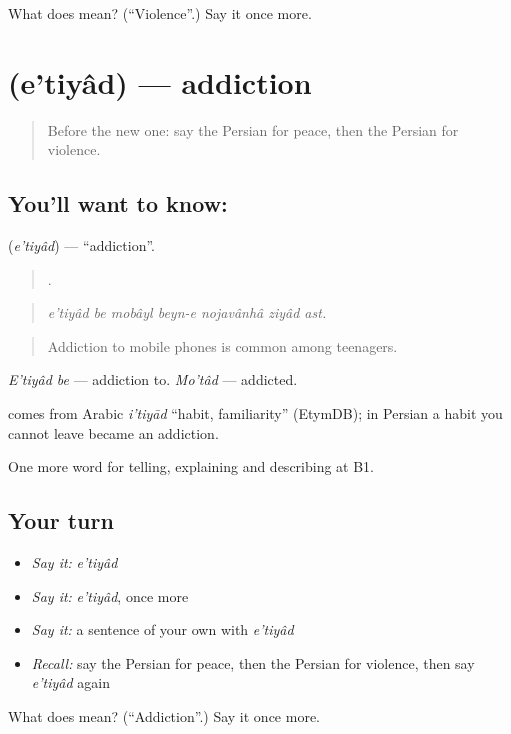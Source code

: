 \begin{tcolorbox}[breakable,colback=teal!4,colframe=teal!35!black,title={Before you move on}]
What does  mean? (\textquotedblleft{}Violence\textquotedblright{}.) Say it once more.
\end{tcolorbox}
\section[\texorpdfstring{\fa{اعتیاد} (e'tiyâd)}{اعتیاد (e'tiyâd)}]{ (e'tiyâd) — addiction}

\label{lesson:FA-C389-etiyad}



\begin{quote}
Before the new one: say the Persian for peace, then the Persian for violence.
\end{quote}

\subsection*{You'll want to know: }
\textbf{} (\emph{e'tiyâd}) — \textquotedblleft{}addiction\textquotedblright{}.

\begin{quote}
      .
\end{quote}

\begin{quote}
\emph{e'tiyâd be mobâyl beyn-e nojavânhâ ziyâd ast.}
\end{quote}

\begin{quote}
Addiction to mobile phones is common among teenagers.
\end{quote}

\emph{E'tiyâd be} — addiction to. \emph{Mo'tâd} — addicted.

\begin{cousinweb}
\textbf{} comes from Arabic \emph{i'tiyād} \textquotedblleft{}habit, familiarity\textquotedblright{} (EtymDB); in Persian a habit you cannot leave became an addiction.
\end{cousinweb}

\begin{grammarlens}[title={What you've built}]
One more word for telling, explaining and describing at B1.
\end{grammarlens}

\subsection*{Your turn}
\begin{itemize}
\raggedright
  \item \emph{Say it:} \emph{e'tiyâd}
  \item \emph{Say it:} \emph{e'tiyâd}, once more
  \item \emph{Say it:} a sentence of your own with \emph{e'tiyâd}
  \item \emph{Recall:} say the Persian for peace, then the Persian for violence, then say \emph{e'tiyâd} again
\end{itemize}

\begin{tcolorbox}[breakable,colback=teal!4,colframe=teal!35!black,title={Before you move on}]
What does  mean? (\textquotedblleft{}Addiction\textquotedblright{}.) Say it once more.
\end{tcolorbox}
